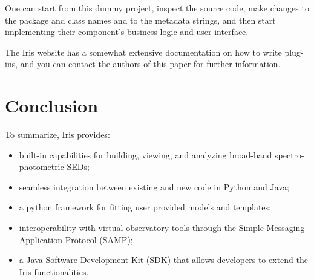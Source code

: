 \documentclass[5p]{elsarticle}
\begin{document}
One can start from this dummy project, inspect the source code, make changes to the package and class names and to the metadata strings, and then start implementing their component's business logic and user interface.

The Iris website has a somewhat extensive documentation on how to write plug-ins, and you can contact the authors of this paper for further information.

\section{Conclusion}
\label{sec:conclusion}

To summarize, Iris provides:
\begin{itemize}
\item built-in capabilities for building, viewing, and analyzing broad-band spectro-photometric SEDs;
\item seamless integration between existing and new code in Python and Java;
\item a python framework for fitting user provided models and templates;
\item interoperability with virtual observatory tools through the Simple Messaging Application Protocol (SAMP);
\item a Java Software Development Kit (SDK) that allows developers to extend the Iris functionalities.
\end{itemize}










\end{document}

